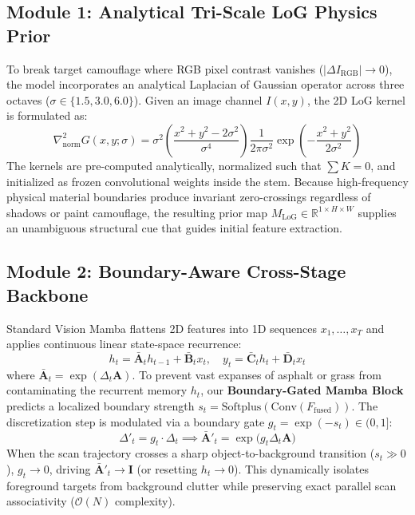 \documentclass[12pt,a4paper]{report}
\begin{document}
\subsection{Module 1: Analytical Tri-Scale LoG Physics Prior}
To break target camouflage where RGB pixel contrast vanishes ($|\Delta I_{\text{RGB}}| \to 0$), the model incorporates an analytical Laplacian of Gaussian operator across three octaves ($\sigma \in \{1.5, 3.0, 6.0\}$). Given an image channel $I(x, y)$, the 2D LoG kernel is formulated as:
\begin{equation}
    \nabla^2_{\text{norm}} G(x, y; \sigma) = \sigma^2 \left( \frac{x^2 + y^2 - 2\sigma^2}{\sigma^4} \right) \frac{1}{2\pi\sigma^2} \exp\left(-\frac{x^2 + y^2}{2\sigma^2}\right)
\end{equation}
The kernels are pre-computed analytically, normalized such that $\sum K = 0$, and initialized as frozen convolutional weights inside the stem. Because high-frequency physical material boundaries produce invariant zero-crossings regardless of shadows or paint camouflage, the resulting prior map $M_{\text{LoG}} \in \mathbb{R}^{1 \times H \times W}$ supplies an unambiguous structural cue that guides initial feature extraction.

\subsection{Module 2: Boundary-Aware Cross-Stage Backbone}
Standard Vision Mamba flattens 2D features into 1D sequences $x_1, \dots, x_T$ and applies continuous linear state-space recurrence:
\begin{equation}
    h_t = \mathbf{\bar{A}}_t h_{t-1} + \mathbf{\bar{B}}_t x_t, \quad y_t = \mathbf{\bar{C}}_t h_t + \mathbf{\bar{D}}_t x_t
\end{equation}
where $\mathbf{\bar{A}}_t = \exp(\Delta_t \mathbf{A})$. To prevent vast expanses of asphalt or grass from contaminating the recurrent memory $h_t$, our \textbf{Boundary-Gated Mamba Block} predicts a localized boundary strength $s_t = \text{Softplus}(\text{Conv}(F_{\text{fused}}))$. The discretization step is modulated via a boundary gate $g_t = \exp(-s_t) \in (0, 1]$:
\begin{equation}
    \Delta'_t = g_t \cdot \Delta_t \implies \mathbf{\bar{A}}'_t = \exp\big(g_t \Delta_t \mathbf{A}\big)
\end{equation}
When the scan trajectory crosses a sharp object-to-background transition ($s_t \gg 0$), $g_t \to 0$, driving $\mathbf{\bar{A}}'_t \to \mathbf{I}$ (or resetting $h_t \to 0$). This dynamically isolates foreground targets from background clutter while preserving exact parallel scan associativity ($\mathcal{O}(N)$ complexity).
\end{document}

